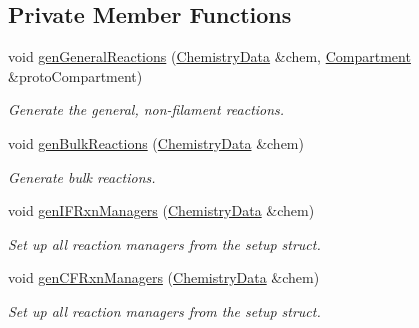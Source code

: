 \subsection*{Private Member Functions}
\begin{DoxyCompactItemize}
\item 
void \hyperlink{classSimpleManagerImpl_a99b517b17f904f2d6fd92a308b459e36}{gen\+General\+Reactions} (\hyperlink{structChemistryData}{Chemistry\+Data} \&chem, \hyperlink{classCompartment}{Compartment} \&proto\+Compartment)
\begin{DoxyCompactList}\small\item\em Generate the general, non-\/filament reactions. \end{DoxyCompactList}\item 
void \hyperlink{classSimpleManagerImpl_a7bb497c77b2eee7ee560d0259061e552}{gen\+Bulk\+Reactions} (\hyperlink{structChemistryData}{Chemistry\+Data} \&chem)
\begin{DoxyCompactList}\small\item\em Generate bulk reactions. \end{DoxyCompactList}\end{DoxyCompactItemize}
{\bf }\par
\begin{DoxyCompactItemize}
\item 
void \hyperlink{classSimpleManagerImpl_a7e196ec854f3d9dff5c930c23e0a656f}{gen\+I\+F\+Rxn\+Managers} (\hyperlink{structChemistryData}{Chemistry\+Data} \&chem)
\begin{DoxyCompactList}\small\item\em Set up all reaction managers from the setup struct. \end{DoxyCompactList}\item 
void \hyperlink{classSimpleManagerImpl_a0018d381ff3b968d74fa261ea9774dee}{gen\+C\+F\+Rxn\+Managers} (\hyperlink{structChemistryData}{Chemistry\+Data} \&chem)
\begin{DoxyCompactList}\small\item\em Set up all reaction managers from the setup struct. \end{DoxyCompactList}\end{DoxyCompactItemize}

